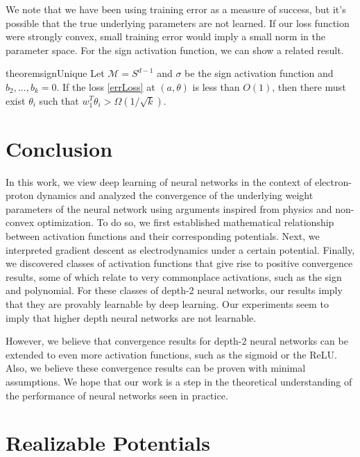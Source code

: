 \documentclass[11pt]{article}
\begin{document}
We note that we have been using training error as a measure of success, but it's possible that the true underlying parameters are not learned. If our loss function were strongly convex, small training error would imply a small norm in the parameter space. For the sign activation function, we can show a related result.

\begin{restatable}{theorem}{signUnique}
\label{SignUnique}
Let $\mathcal{M} = S^{d-1}$ and $\sigma$ be the sign activation function and $b_2,...,b_k = 0$. If the loss \eqref{errLoss} at $(a,\theta)$ is less than $O(1)$, then there must exist $\theta_i$ such that $w_1^T\theta_i > \Omega(1/\sqrt{k})$.
\end{restatable}



\section{Conclusion}

In this work, we view deep learning of neural networks in the context of electron-proton dynamics and analyzed the convergence of the underlying weight parameters of the neural network using arguments inspired from physics and non-convex optimization. To do so, we first established mathematical relationship between activation functions and their corresponding potentials. Next, we interpreted gradient descent as electrodynamics under a certain potential. Finally, we discovered classes of activation functions that give rise to positive convergence results, some of which relate to very commonplace activations, such as the sign and polynomial. For these classes of depth-2 neural networks, our results imply that they are provably learnable by deep learning. Our experiments seem to imply that higher depth neural networks are not learnable. 

However, we believe that convergence results for depth-2 neural networks can be extended to even more activation functions, such as the sigmoid or the ReLU. Also, we believe these convergence results can be proven with minimal assumptions. We hope that our work is a step in the theoretical understanding of the performance of neural networks seen in practice.







\newpage
\appendix

\section{Realizable Potentials}
\label{realizable}
\end{document}
